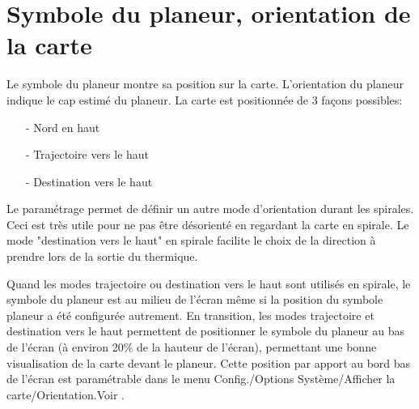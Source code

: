 \section{Symbole du planeur, orientation de la carte}
Le symbole du planeur montre sa position sur la carte. L'orientation du planeur indique le cap estimé du planeur.
La carte est positionnée de 3 façons possibles:
\begin{enumerate}
\item [-] Nord en haut
\item [-] Trajectoire vers le haut
\item [-] Destination vers le haut
\end{enumerate}
Le paramétrage   permet de définir un autre mode d'orientation durant les spirales. Ceci est très utile pour ne pas être désorienté en regardant la carte en spirale. Le mode "destination vers le haut" en spirale facilite le choix de la direction à prendre lors de la sortie du thermique.

Quand les modes trajectoire ou destination vers le haut sont utilisés en spirale, le symbole du planeur est au milieu de l'écran même si la position du symbole planeur a été configurée autrement.  En transition, les modes trajectoire et destination vers le haut permettent de positionner le symbole du planeur au bas de l'écran (à environ 20\% de la hauteur de l'écran), permettant une bonne visualisation de la carte devant le planeur. Cette position par apport au bord bas de l'écran est paramétrable dans le menu Config./Options Système/Afficher la carte/Orientation.Voir .

